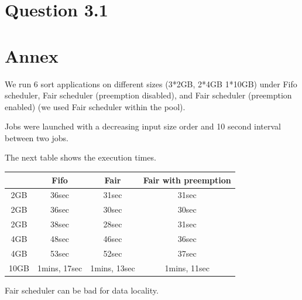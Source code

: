 \documentclass{article}
\begin{document}
\section*{Question 3.1}

\section*{Annex}

We run 6 sort applications on different sizes (3*2GB, 2*4GB 1*10GB) under Fifo scheduler, Fair scheduler (preemption disabled), and Fair scheduler
(preemption enabled) (we used Fair scheduler within the pool).

Jobs were launched with a decreasing input size order and 10 second interval between two
jobs.


The next table shows the execution times.

\begin{center}
\begin{tabular}{|c|c|c|c|}
\hline
\ & Fifo & Fair & Fair with preemption \\
\hline
2GB & 36sec & 31sec & 31sec \\
\hline
2GB & 36sec & 30sec & 30sec \\
\hline
2GB & 38sec & 28sec & 31sec \\
\hline
4GB & 48sec & 46sec & 36sec \\
\hline
4GB & 53sec & 52sec & 37sec \\
\hline
10GB & 1mins, 17sec & 1mins, 13sec & 1mins, 11sec \\
\hline
\end{tabular}
\end{center}

Fair scheduler can be bad for data locality.
\end{document}
